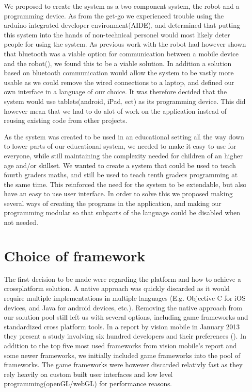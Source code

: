 We proposed to create the system as a two component system, the \chirp robot and a programming device. 
As from the get-go we experienced trouble using the arduino integrated developer environment(AIDE), and determined that putting this system into the hands of non-technical personel would most likely deter people for using the system. 
As previous work with the robot had however shown that bluetooth was a viable option for communication between a mobile device and the robot(\cite{chrip2013ResearcherNight}), we found this to be a viable solution.
In addition a solution based on bluetooth communication would allow the system to be vastly more usable as we could remove the wired connections to a laptop, and defined our own interface in a language of our choice.
It was therefore decided that the system would use tablets(android, iPad, ect) as its programming device. This did however mean that we had to do alot of work on the application instead of reusing existing code from other projects. 

\bigskip\noindent
As the system was created to be used in an educational setting all the way down to lower parts of our educational system, 
we needed to make it easy to use for everyone, while still maintaining the complexity needed for children of an higher age and/or skillset. 
We wanted to create a system that could be used to teach fourth graders maths, and still be used to teach tenth graders programming at the same time. 
This reinforced the need for the system to be extendable, but also have an easy to use user interface. 
In order to solve this we proposed making several ways of creating the programs in the application, and making our programming modular so that subparts of the language could be disabled when not needed.
	
\section{Choice of framework}
	The first decision to be made were regarding the platform and how to achieve a crossplatform solution. 
	A native approach was quickly discarded as it would require multiple implementations in multiple languages (E.g. Objective-C for iOS devices, and Java for android devices, etc.). 
	Removing the native approach from our solution pool still left us with several options, including game frameworks and standardized cross platform tools.
	In a report by vision mobile in January 2013 they present a study involving six hundred developers and their preferences (\cite{developerCPT}). 
	In addition to the top five most used frameworks from vision mobile's report and some newer frameworks, we initially included game frameworks into the pool of frameworks. 
	The game frameworks were however discarded relativly fast as they rely heavily on custom built user interfaces and low level programming(openGL/webGL) for performance reasons.
	
